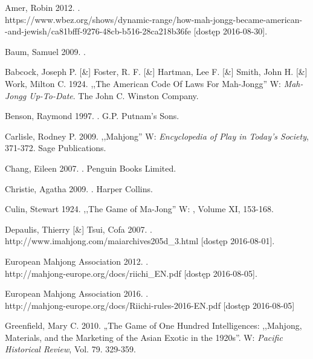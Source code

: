 \onecolumn
\biblio
\setlength{\parindent}{0pt}
\setlength{\parskip}{1ex plus 0.5ex minus 0.2ex}

Amer, Robin 2012. .
\\https://www.wbez.org/shows/dynamic-range/how-mah-jongg-became-american-\\-and-jewish/ca81bfff-9276-48cb-b516-28ca218b36fe
[dostęp 2016-08-30].

Baum, Samuel 2009. .

Babcock, Joseph P. [\&] Foster, R. F. [\&] Hartman, Lee F. [\&] Smith, John H.
[\&] Work, Milton C. 1924. ,,The American Code Of Laws For Mah-Jongg'' W:
\textit{Mah-Jongg Up-To-Date}. The John C. Winston Company. 

Benson, Raymond 1997. . G.P. Putnam's Sons.

Carlisle, Rodney P. 2009. ,,Mahjong'' W: \textit{Encyclopedia of Play in Today's
Society}, 371-372.
Sage Publications.

Chang, Eileen 2007. . Penguin Books Limited.

Christie, Agatha 2009. . Harper Collins.

Culin, Stewart 1924. ,,The Game of Ma-Jong'' W: , Volume XI, 153-168.

Depaulis, Thierry [\&] Tsui, Cofa 2007. . 
\\http://www.imahjong.com/maiarchives205d\_3.html [dostęp
2016-08-01].

European Mahjong Association 2012. .
\\http://mahjong-europe.org/docs/riichi\_EN.pdf [dostęp 2016-08-05].

European Mahjong Association 2016. .
\\http://mahjong-europe.org/docs/Riichi-rules-2016-EN.pdf [dostęp 2016-08-05]

Greenfield, Mary C. 2010. „The Game of One Hundred Intelligences: ,,Mahjong,
Materials, and the Marketing of the Asian Exotic in the 1920s''. W:
\textit{Pacific Historical Review}, Vol. 79. 329-359.

